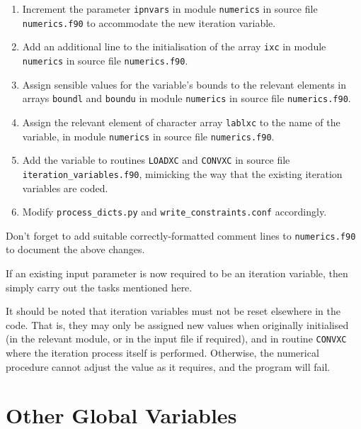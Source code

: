 \documentclass[11pt,a4paper]{report}
\begin{document}
\begin{enumerate}

\item Increment the parameter \texttt{ipnvars} in module \texttt{numerics} in
  source file \texttt{numerics.f90} to accommodate the new iteration variable.

\item Add an additional line to the initialisation of the array \texttt{ixc}
  in module \texttt{numerics} in source file \texttt{numerics.f90}.

\item Assign sensible values for the variable's bounds to the relevant
  elements in arrays \texttt{boundl} and \texttt{boundu} in module
  \texttt{numerics} in source file \texttt{numerics.f90}.

\item Assign the relevant element of character array \texttt{lablxc} to the
  name of the variable, in module \texttt{numerics} in source file
  \texttt{numerics.f90}.

\item Add the variable to routines \texttt{LOADXC} and \texttt{CONVXC} in
  source file \texttt{iteration\_variables.f90}, mimicking the way that the
  existing iteration variables are coded.

\item Modify \texttt{process\_dicts.py} and \texttt{write\_constraints.conf}
  accordingly.

\end{enumerate}

Don't forget to add suitable correctly-formatted comment lines to
\texttt{numerics.f90} to document the above changes.

If an existing input parameter is now required to be an iteration variable,
then simply carry out the tasks mentioned here.

It should be noted that iteration variables must not be reset elsewhere in the
code. That is, they may only be assigned new values when originally
initialised (in the relevant module, or in the input file if required), and in
routine \texttt{CONVXC} where the iteration process itself is performed.
Otherwise, the numerical procedure cannot adjust the value as it requires, and
the program will fail.

\section{Other Global Variables}
\end{document}
